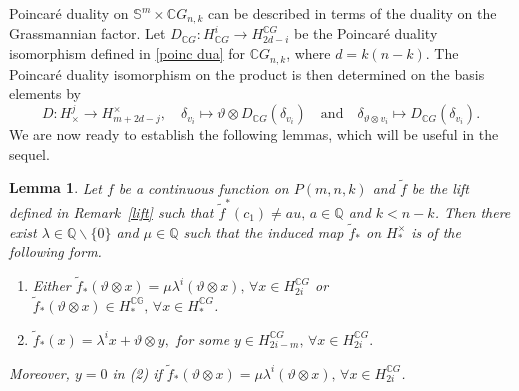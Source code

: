 \documentclass{amsart}
\newtheorem{lemma}[theorem]{Lemma}
\newcommand{\remref}[1]{Remark~\ref{#1}}
\begin{document}
		Poincar\'e duality on $\mathbb S^{m}\times \mathbb C G_{n,k}$ can be described in terms of the duality on the Grassmannian factor. Let 
		$D_{\mathbb C G}\colon H^{i}_{\mathbb C G}\to H_{2d-i}^{\mathbb C G}$ 
		be the Poincar\'e duality isomorphism defined in \eqref{poinc dua} for $\mathbb C G_{n,k}$, where $d=k(n-k)$.  
		The Poincar\'e duality isomorphism on the product
		is then determined on the basis elements by  
		\begin{equation}
			D\colon H^{j}_{\times}\to H_{m+2d-j}^{\times}, \quad \delta_{v_i}\mapsto \vartheta\otimes D_{\mathbb C G}(\delta_{v_i})\quad\text{and}\quad \delta_{\vartheta\otimes v_i} \mapsto D_{\mathbb C G}(\delta_{v_i}).
		\end{equation}
		We are now ready to establish the following lemmas, which will be useful in the sequel.
	\begin{lemma}\label{image of homf}
		Let $f$ be a continuous function on $P(m,n,k)$ and $\tilde{f}$ be the lift defined in \remref{lift} such that $\tilde{f}^*(c_1)\neq au,\, a\in \mathbb{Q}$ and $k<n-k$. Then there exist $\lambda \in \mathbb{Q}\backslash \{0\}$ and $\mu \in \mathbb{Q}$ such that the induced map $\tilde{f}_*$ on $H_*^{\times}$ is of the following form.
		\begin{enumerate}
			\item Either $\tilde{f}_*(\vartheta\otimes x) = \mu \lambda^i (\vartheta \otimes x),\, \forall x\in H_{2i}^{\mathbb{C}G}$ or $\tilde{f}_*(\vartheta\otimes x) \in H_*^{\mathbb{CG}},\, \forall x \in H_*^{\mathbb{C}G}$.
			\item $\tilde{f}_*(x) = \lambda^i x + \vartheta\otimes y,$ for some $y \in H_{2i-m}^{\mathbb{C}G}, \, \forall x \in H_{2i}^{\mathbb{C}G}.$
		\end{enumerate}
		Moreover, $y=0$ in \textit{(2)} if $\tilde{f}_*(\vartheta\otimes x) = \mu \lambda^i (\vartheta \otimes x),\, \forall x\in H_{2i}^{\mathbb{C}G}$.
	\end{lemma}
\end{document}
